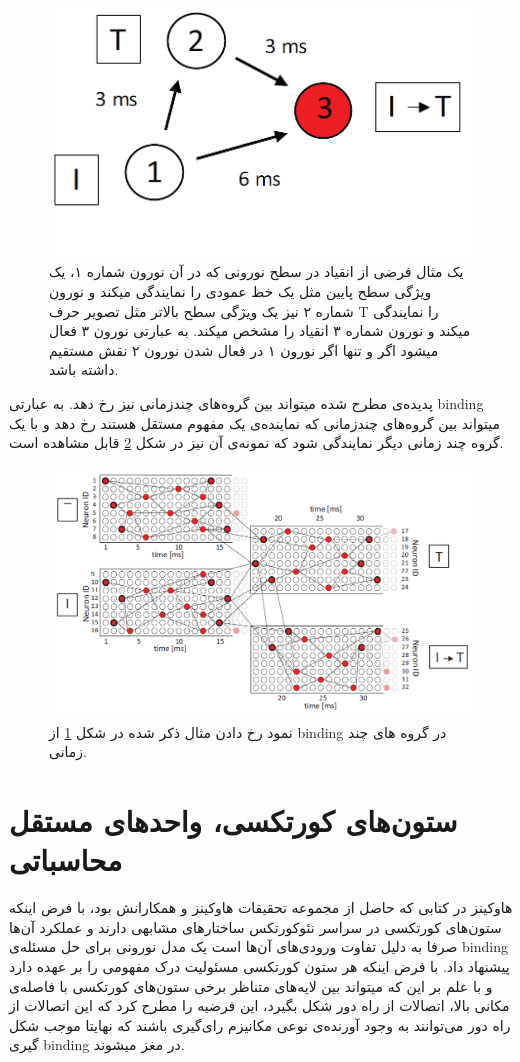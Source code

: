 \documentclass[12pt]{report}
\begin{document}
	\begin{figure}[H]
		\centering
		\includegraphics[width=0.7\linewidth]{poly-bind.png}
		\caption[NS]{
			یک مثال فرضی از انقیاد در سطح نورونی که در آن نورون شماره ۱، یک ویژگی سطح پایین مثل یک خط عمودی را نمایندگی میکند و نورون شماره ۲ نیز یک ویژگی سطح بالاتر مثل تصویر حرف T را نمایندگی میکند و نورون شماره ۳ انقیاد را مشخص میکند. به عبارتی نورون ۳ فعال میشود اگر و تنها اگر نورون ۱ در فعال شدن نورون ۲ نقش مستقیم داشته باشد.
		}
		\label{fig:eguchi-binding}
	\end{figure}
	
	پدیده‌ی مطرح شده میتواند بین گروه‌های چندزمانی نیز رخ دهد. به عبارتی \gls{binding} میتواند بین گروه‌های چندزمانی که نماینده‌ی یک مفهوم مستقل هستند رخ دهد و با یک گروه چند زمانی دیگر نمایندگی شود که نمونه‌ی آن نیز در شکل \ref{fig:eguchi-binding-group} قابل مشاهده است.
	
	\begin{figure}[H]
		\centering
		\includegraphics[width=0.7\linewidth]{poly-group-bind.png}
		\caption[NS]{
			نمود رخ دادن مثال ذکر شده در شکل \ref{fig:eguchi-binding}  از \gls{binding} در گروه های چند زمانی.
		}
		\label{fig:eguchi-binding-group}
	\end{figure}
	
	\section{ستون‌های کورتکسی، واحد‌های مستقل محاسباتی}
	هاوکینز در کتابی \cite{Hawkins2021-rq} که حاصل از مجموعه تحقیقات هاوکینز و همکارانش
	\cite{Hawkins2016, Hawkins2017, Lewis2019}
	بود، با فرض اینکه ستون‌های کورتکسی در سراسر نئوکورتکس ساختار‌های مشابهی دارند و عملکرد آن‌ها صرفا به دلیل تفاوت ورودی‌های آن‌ها است \cite{Mountcastle1978} یک مدل نورونی برای حل مسئله‌ی \gls{binding} پیشنهاد داد. با فرض اینکه هر ستون کورتکسی مسئولیت درک مفهومی را بر عهده دارد و با علم بر این که میتواند بین لایه‌های متناظر برخی ستون‌های کورتکسی با فاصله‌ی مکانی بالا، اتصالات از راه دور شکل بگیرد، این فرضیه را مطرح کرد که این اتصالات از راه دور می‌توانند به وجود آورنده‌ی نوعی مکانیزم رای‌گیری باشند که نهایتا موجب شکل گیری \gls{binding} در مغز میشوند.
	
\end{document}
